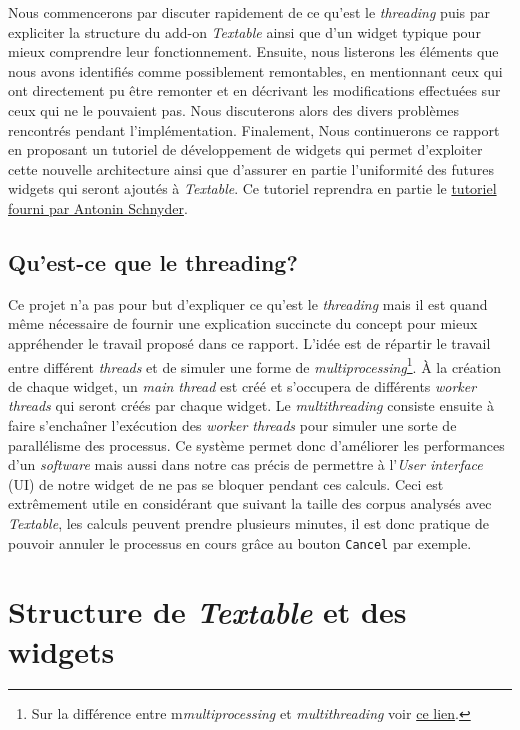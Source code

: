 \documentclass{article}
\begin{document}
Nous commencerons par discuter rapidement de ce qu'est le \textit{threading} puis par expliciter la structure du add-on \textit{Textable} ainsi que d'un widget typique pour mieux comprendre leur fonctionnement. Ensuite, nous listerons les éléments que nous avons identifiés comme possiblement remontables, en mentionnant ceux qui ont directement pu être remonter et en décrivant les modifications effectuées sur ceux qui ne le pouvaient pas. Nous discuterons alors des divers problèmes rencontrés pendant l'implémentation. Finalement, Nous continuerons ce rapport en proposant un tutoriel de développement de widgets qui permet d'exploiter cette nouvelle architecture ainsi que d'assurer en partie l'uniformité des futures widgets qui seront ajoutés à \textit{Textable}. Ce tutoriel reprendra en partie le \href{https://docs.google.com/document/d/1QtXm2aYMZXAyM7mfBTqxt_XrTNFqC7e3aqy7OC1A_18/edit}{tutoriel fourni par Antonin Schnyder}.

\subsection{Qu'est-ce que le threading?}

Ce projet n'a pas pour but d'expliquer ce qu'est le \textit{threading} mais il est quand même nécessaire de fournir une explication succincte du concept pour mieux appréhender le travail proposé dans ce rapport.
L'idée est de répartir le travail entre différent \textit{threads} et de simuler une forme de \textit{multiprocessing}\footnote{Sur la différence entre m\textit{multiprocessing} et \textit{multithreading} voir \href{https://www.geeksforgeeks.org/difference-between-multithreading-vs-multiprocessing-in-python/}{ce lien}.}. À la création de chaque widget, un \textit{main thread} est créé et s'occupera de différents \textit{worker threads} qui seront créés par chaque widget. Le \textit{multithreading} consiste ensuite à faire s'enchaîner l'exécution des \textit{worker threads} pour simuler une sorte de parallélisme des processus. 
Ce système permet donc d'améliorer les performances d'un \textit{software} mais aussi dans notre cas précis de permettre à l'\textit{User interface} (UI) de notre widget de ne pas se bloquer pendant ces calculs. Ceci est extrêmement utile en considérant que suivant la taille des corpus analysés avec \textit{Textable}, les calculs peuvent prendre plusieurs minutes, il est donc pratique de pouvoir annuler le processus en cours grâce au bouton \texttt{Cancel} par exemple.

\section{Structure de \textit{Textable} et des widgets}
\end{document}
